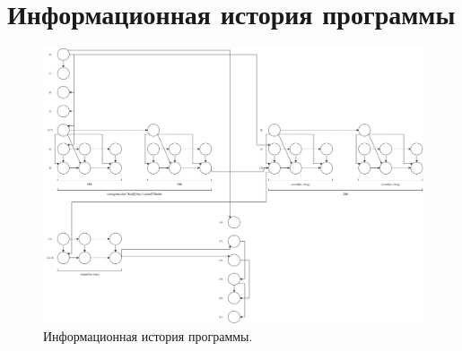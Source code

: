\documentclass[12pt]{report}
\begin{document}
\section{Информационная история программы}

\begin{figure}[hp!]
	\centering
	\includegraphics[scale=0.3]{report_files/information_history.png}
	\caption{Информационная история программы.}
	\label{fig:mpr}
\end{figure}




\end{document}
